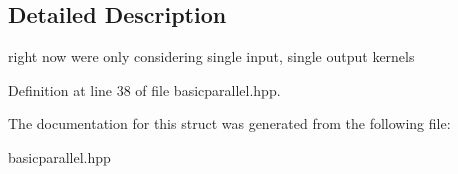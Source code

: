 \subsection{Detailed Description}
right now we\textquotesingle{}re only considering single input, single output kernels 

Definition at line 38 of file basicparallel.\+hpp.



The documentation for this struct was generated from the following file\+:\begin{DoxyCompactItemize}
\item 
basicparallel.\+hpp\end{DoxyCompactItemize}

